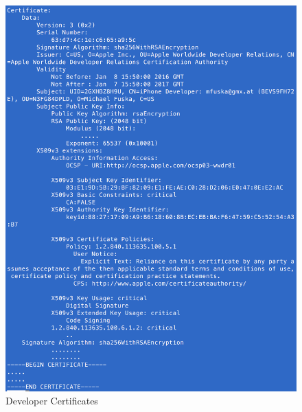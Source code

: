 \begin{figure}[htbp!]
        \centering
                \includegraphics[scale=0.7]{Cert-output}
        \caption{Developer Certificates \protect\footnotemark}
        \label{fig:DeveloperCertificates}
\end{figure}
\newpage

